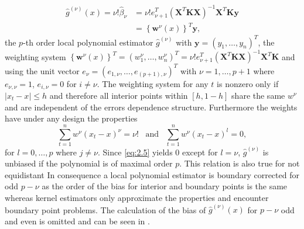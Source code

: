 \documentclass[12pt]{article}
\begin{document}
\begin{equation}
\label{eq:Trend}
\begin{split}
\hat{g}^{(\nu)}(x) = \nu!\hat{\beta}_{\nu} & = \nu! e_{\nu+1}^{T} (\mathbf{X}^{T} \mathbf{KX})^{-1} \mathbf{X}^{T} \mathbf{K} \mathbf{y} \\
& = \left\lbrace \mathbf{w}^{\nu}(x) \right\rbrace^{T} \mathbf{y},
\end{split}
\end{equation}
the \(p\)-th order local polynomial estimator \(\hat{g}^{(\nu)}\) with \(\mathbf{y} = (y_{1},\ldots,y_{n})^{T}\), the weighting system \(\left\lbrace \mathbf{w}^{\nu}(x) \right\rbrace^{T} = (w_{1}^{\nu},\ldots,w_{n}^{\nu})^{T} = \nu! e_{\nu+1}^{T} 
(\mathbf{X}^{T} \mathbf{KX})^{-1} \mathbf{X}^{T} \mathbf{K}\) and
using the unit vector \(e_{\nu} = (e_{1,\nu},\ldots,e_{(p+1),\nu})^{T}\) with
\(\nu = 1,\ldots,p+1\) where \(e_{\nu,\nu} = 1\), \(e_{i,\nu} = 0\) for \(i \neq \nu\).
The weighting system for any \(t\) is nonzero only if \(|x_{t} - x| \leq h\) and therefore all interior points within \([h,1-h]\) share the same \(w^{\nu}\) and are independent of the errors dependence structure. 
Furthermore the weights have under any design the properties
\begin{equation}
\label{eq:2.5}
\sum_{t=1}^{n} w^{\nu} (x_{t} - x)^{\nu} = \nu! \,\,\,\,\, \text{and} \,\,\,\,\,  \sum_{t=1}^{n} w^{\nu} (x_{t} - x)^{l} = 0,
\end{equation}
for \(l=0,\ldots,p\) where \(j\neq\nu\). Since \eqref{eq:2.5} yields \( 0 \)  except for \(l = \nu\), \(\hat{g}^{(\nu)}\) is unbiased if the polynomial is of maximal order \(p\). This relation is also true for not equidistant 
In consequence a local polynomial estimator is boundary corrected for odd \(p - \nu\) as the order of the bias for interior and boundary points is the same whereas kernel estimators only approximate the properties and encounter boundary point problems.
The calculation of the bias of \(\hat{g}^{(\nu)}(x)\) for \(p - \nu\) odd and even is omitted and can be seen in \textcite{beran2016long}.
\end{document}
